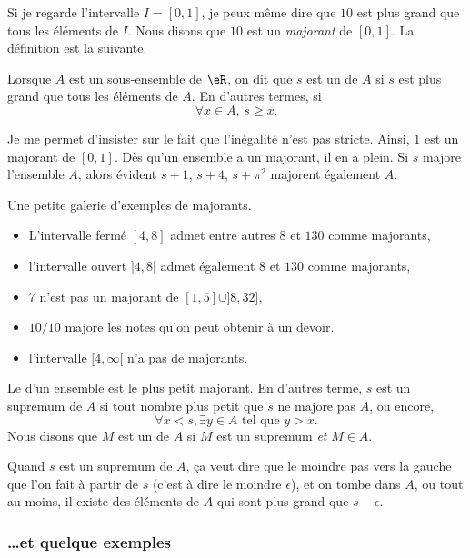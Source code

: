   Si je regarde l'intervalle $I=[0,1]$, je peux même dire que $10$ est plus grand que tous les éléments de $I$. Nous disons que $10$ est un \emph{majorant} de $[0,1]$. La définition est la suivante.
\begin{definition}
Lorsque $A$ est un sous-ensemble de $\eR$, on dit que $s$ est un  de $A$ si $s$ est plus grand que tous les éléments de $A$. En d'autres termes, si
\[
  \forall x\in A,\,s\geq x.
\]
\end{definition}
Je me permet d'insister sur le fait que l'inégalité n'est pas stricte. Ainsi, $1$ est un majorant de $[0,1]$. Dès qu'un ensemble a un majorant, il en a plein. Si $s$ majore l'ensemble $A$, alors évident $s+1$, $s+4$, $s+\pi^2$ majorent également $A$.

\begin{example}
Une petite galerie d'exemples de majorants.
\begin{itemize}
\item L'intervalle fermé $[4,8]$ admet entre autres $8$ et $130$ comme majorants,
\item l'intervalle ouvert $]4,8[$ admet également $8$ et $130$ comme majorants,
\item $7$ n'est pas un majorant de $[1,5]\cup]8,32]$,
\item $10/10$ majore les notes qu'on peut obtenir à un devoir.
\item l'intervalle $[4,\infty[$ n'a pas de majorants.
\end{itemize}
\end{example}

\begin{definition}
Le  d'un ensemble est le plus petit majorant. En d'autres terme, $s$ est un supremum de $A$ si tout nombre plus petit que $s$ ne majore pas $A$, ou encore,
\[
  \forall x<s,\exists y\in A\text{ tel que } y>x.
\]
Nous disons que $M$ est un  de $A$ si $M$ est un supremum \emph{et} $M\in A$.
\end{definition}
Quand $s$ est un supremum de $A$, ça veut dire que le moindre pas vers la gauche que l'on fait à partir de $s$ (c'est à dire le moindre $\epsilon$), et on tombe dans $A$, ou tout au moins, il existe des éléments de $A$ qui sont plus grand que $s-\epsilon$.

\subsubsection{\ldots et quelque exemples}

